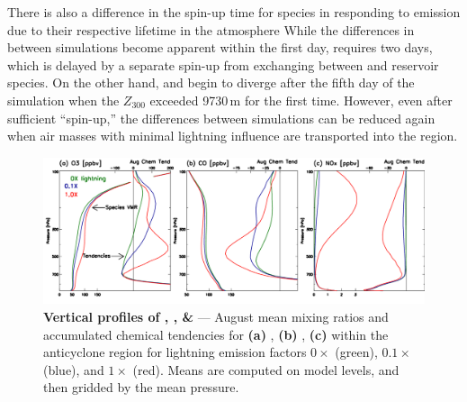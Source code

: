 There is also a difference in the spin-up time for species in responding to {\lnox} emission due to their respective lifetime in
the atmosphere While the differences in  between simulations become apparent within the first day,  requires 
two days, which is delayed by a separate spin-up from exchanging between  and reservoir species. On the other hand,
 and  begin to diverge after the fifth day of the simulation when the $Z_{300}$ exceeded 9730\,\unit{m} for the first
time.  However, even after sufficient ``spin-up,'' the differences between simulations can be reduced again when air masses with minimal lightning
influence are transported into the region.




	\begin{figure}[t!]
		\centering
		\includegraphics[width=1.0\textwidth]{sens/ltngsens_vert.png}
		\caption[Vertical sensitivity profiles of , , \&  to lightning]{\textbf{Vertical
		profiles of , , \& } --- August mean mixing ratios and
		accumulated chemical tendencies for {\bf(a)} , {\bf(b)} , {\bf(c)}  within the anticyclone
		region for lightning emission factors $0\times$ (green), $0.1\times$ (blue), and $1\times$ (red). Means are
		computed on model levels, and then gridded by the mean pressure.
		\label{fig:2006/ltngsens_vertical} }\vspace{-.3in}
	\end{figure}

